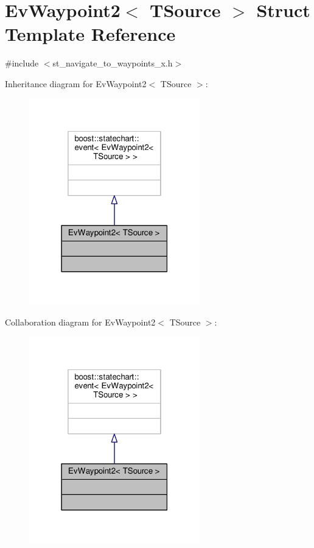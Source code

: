 \hypertarget{structEvWaypoint2}{}\section{Ev\+Waypoint2$<$ T\+Source $>$ Struct Template Reference}
\label{structEvWaypoint2}


{\ttfamily \#include $<$st\+\_\+navigate\+\_\+to\+\_\+waypoints\+\_\+x.\+h$>$}



Inheritance diagram for Ev\+Waypoint2$<$ T\+Source $>$\+:
\nopagebreak
\begin{figure}[H]
\begin{center}
\leavevmode
\includegraphics[width=210pt]{structEvWaypoint2__inherit__graph}
\end{center}
\end{figure}


Collaboration diagram for Ev\+Waypoint2$<$ T\+Source $>$\+:
\nopagebreak
\begin{figure}[H]
\begin{center}
\leavevmode
\includegraphics[width=210pt]{structEvWaypoint2__coll__graph}
\end{center}
\end{figure}


